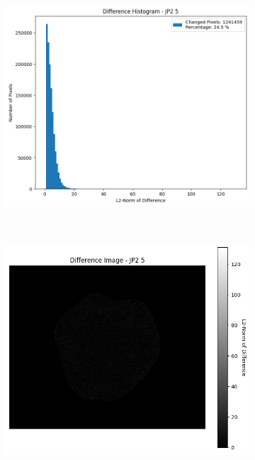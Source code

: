 \begin{figure}[htb]
\begin{subfigure}[b]{0.48\textwidth}
        \includegraphics[width=\textwidth]{doc/thesis/0_figures/compare_quality/set1/jp2_5_diff_histogram.png}
        \caption{}
        \label{fig:img_quality_comp_jp2_5_histo}
    \end{subfigure}
    \\
    \begin{subfigure}[b]{0.48\textwidth}
        \centering
        \includegraphics[width=\textwidth]{doc/thesis/0_figures/compare_quality/set1/jp2_5_diff_heatmap.png}
        \caption{}
        \label{fig:img_quality_comp_jp2_5_diff}

\end{subfigure}
\end{figure}
